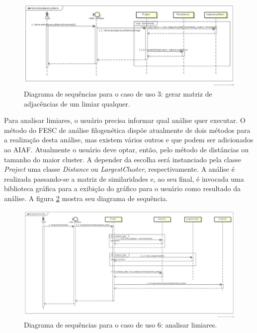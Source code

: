 \begin{figure}
\centering
\includegraphics[scale=0.42]{generate-adjacency-matrix}
\caption{Diagrama de sequências para o caso de uso 3: gerar matriz de adjacências de um limiar qualquer.}
\label{fig:generate-adjacency-matrix}
\end{figure}

Para analisar limiares, o usuário precisa informar qual análise quer executar. O método do FESC de análise filogenética dispõe atualmente de dois métodos
para a realização desta análise, mas existem vários outros e que podem ser adicionados ao AIAF. Atualmente o usuário deve optar, então, pelo método de
distâncias ou tamanho do maior cluster. A depender da escolha será instanciado pela classe \textit{Project} uma classe \textit{Distance} ou
\textit{LargestCluster}, respectivamente. A análise é realizada passando-se a matriz de similaridades e, ao seu final, é invocada uma biblioteca gráfica
para a exibição do gráfico para o usuário como resultado da análise. A figura \ref{fig:analyse-threshold} mostra seu diagrama de sequência. \newline

\begin{figure}
\centering
\includegraphics[scale=0.34]{analyse-threshold}
\caption{Diagrama de sequências para o caso de uso 6: analisar limiares.}
\label{fig:analyse-threshold}
\end{figure}

